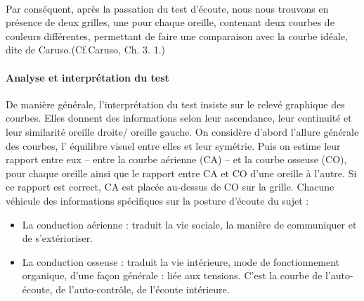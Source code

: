  \\
 Par conséquent, après la passation du test d\textquoteright écoute, nous nous
trouvons en présence de deux grilles, une  pour chaque oreille, contenant deux courbes
de couleurs différentes, permettant de faire une comparaison avec la courbe
 idéale, dite de Caruso.(Cf.Caruso, Ch. 3. 1.)
\paragraph{Analyse et interprétation du test}
De manière générale, l'interprétation du test insiste sur le relevé graphique
des
courbes. Elles donnent des informations selon leur ascendance, leur
continuité et leur similarité oreille droite/ oreille gauche.
On considère d'abord l'allure générale des courbes,
 l' équilibre visuel entre elles et leur symétrie.
Puis on estime
leur rapport entre eux -- entre la courbe aérienne (CA) -- et la courbe osseuse (CO),
pour chaque oreille ainsi que le rapport entre CA et CO d\textquoteright une
oreille à l'autre. Si ce rapport est correct, CA est placée au-dessus
de CO sur la grille.
Chacune  véhicule des informations spécifiques
sur la posture d'écoute du sujet :
\begin{itemize}
\item La conduction aérienne : traduit la vie sociale, la manière de communiquer
et de s'extérioriser.
\item La conduction osseuse : traduit la vie intérieure, mode de fonctionnement
organique, d'une façon générale : liée aux tensions. C'est la courbe
de l\textquoteright auto-écoute, de l\textquoteright auto-contrôle,
de l'écoute intérieure.
\end{itemize}

